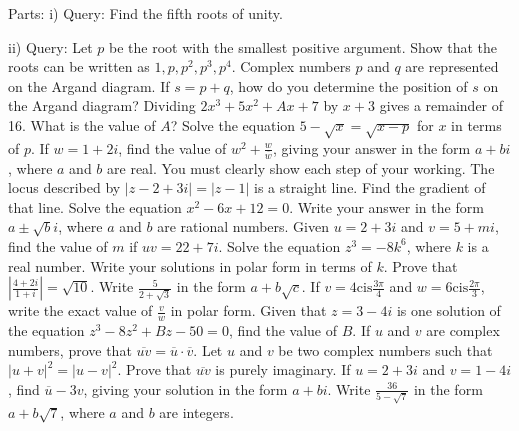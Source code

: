 \documentclass[12pt,addpoints]{exam}
\begin{document}
\begin{questions}
Parts:
i) Query: Find the fifth roots of unity.

ii) Query: Let \( p \) be the root with the smallest positive argument. Show that the roots can be written as \( 1, p, p^2, p^3, p^4 \).
\fillwithlines{3cm}
\question[5] Complex numbers \( p \) and \( q \) are represented on the Argand diagram. If \( s = p + q \), how do you determine the position of \( s \) on the Argand diagram?
\fillwithlines{3cm}
\question[5] Dividing \( 2x^3 + 5x^2 + Ax + 7 \) by \( x + 3 \) gives a remainder of 16. What is the value of \( A \)?
\fillwithlines{3cm}
\question[5] Solve the equation \( 5 - \sqrt{x} = \sqrt{x - p} \) for \( x \) in terms of \( p \).
\fillwithlines{3cm}
\question[5] If \( w = 1 + 2i \), find the value of \( w^2 + \frac{w}{\overline{w}} \), giving your answer in the form \( a + bi \), where \( a \) and \( b \) are real. You must clearly show each step of your working.
\fillwithlines{3cm}
\question[5] The locus described by \( |z - 2 + 3i| = |z - 1| \) is a straight line. Find the gradient of that line.
\fillwithlines{3cm}
\question[5] Solve the equation \(x^2 - 6x + 12 = 0\). Write your answer in the form \(a \pm \sqrt{b}i\), where \(a\) and \(b\) are rational numbers.
\fillwithlines{3cm}
\question[5] Given \( u = 2 + 3i \) and \( v = 5 + mi \), find the value of \( m \) if \( uv = 22 + 7i \).
\fillwithlines{3cm}
\question[5] Solve the equation \(z^3 = -8k^6\), where \(k\) is a real number. Write your solutions in polar form in terms of \(k\).
\fillwithlines{3cm}
\question[5] Prove that \(\left| \frac{4 + 2i}{1 + i} \right| = \sqrt{10}\).
\fillwithlines{3cm}
\question[5] Write \( \frac{5}{2+\sqrt{3}} \) in the form \( a + b\sqrt{c} \).
\fillwithlines{3cm}
\question[5] If \( v = 4 \text{cis} \frac{3\pi}{4} \) and \( w = 6 \text{cis} \frac{2\pi}{3} \), write the exact value of \( \frac{v}{w} \) in polar form.
\fillwithlines{3cm}
\question[5] Given that \( z = 3 - 4i \) is one solution of the equation \( z^3 - 8z^2 + Bz - 50 = 0 \), find the value of \( B \).
\fillwithlines{3cm}
\question[5] If \( u \) and \( v \) are complex numbers, prove that \( \overline{uv} = \overline{u} \cdot \overline{v} \).
\fillwithlines{3cm}
\question[5] Let \( u \) and \( v \) be two complex numbers such that \( |u+v|^2 = |u-v|^2 \). Prove that \( \overline{uv} \) is purely imaginary.
\fillwithlines{3cm}
\question[5] If \( u = 2 + 3i \) and \( v = 1 - 4i \), find \( \overline{u} - 3v \), giving your solution in the form \( a + bi \).
\fillwithlines{3cm}
\question[5] Write \( \frac{36}{5 - \sqrt{7}} \) in the form \( a + b\sqrt{7} \), where \( a \) and \( b \) are integers.

\end{questions}
\end{document}
